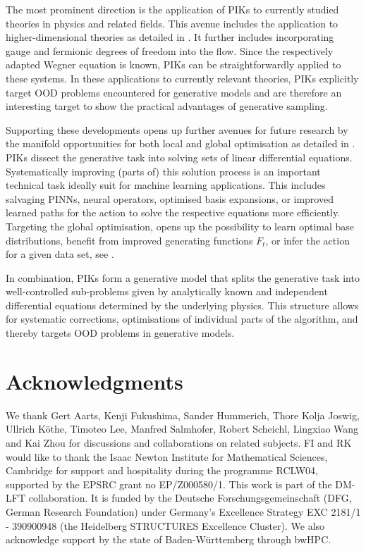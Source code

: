\documentclass[reprint,amsmath,amssymb,aps,pra,superscriptaddress,nofootinbib,twocolumn,floatfix,nolongbibliography]{revtex4-2}
\begin{document}
The most prominent direction is the application of PIKs to currently studied theories in physics and related fields. This avenue includes the application to higher-dimensional theories as detailed in . It further includes incorporating gauge and fermionic degrees of freedom into the flow. Since the respectively adapted Wegner equation is known, PIKs can be straightforwardly applied to these systems. In these applications to currently relevant theories, PIKs explicitly target OOD problems encountered for generative models and are therefore an interesting target to show the practical advantages of generative sampling.

Supporting these developments opens up further avenues for future research by the manifold opportunities for both local and global optimisation as detailed in . PIKs dissect the generative task into solving sets of linear differential equations. Systematically improving (parts of) this solution process is an important technical task ideally suit for machine learning applications. This includes salvaging PINNs, neural operators, optimised basis expansions, or improved learned paths for the action to solve the respective equations more efficiently. Targeting the global optimisation, opens up the possibility to learn optimal base distributions, benefit from improved generating functions $F_t$, or infer the action for a given data set, see .

In combination, PIKs form a generative model that splits the generative task into well-controlled sub-problems given by analytically known and independent differential equations determined by the underlying physics. This structure allows for systematic corrections, optimisations of individual parts of the algorithm, and thereby targets OOD problems in generative models.


\section*{Acknowledgments}

We thank Gert Aarts, Kenji Fukushima, Sander Hummerich, Thore Kolja Joswig, Ullrich Köthe, Timoteo Lee, Manfred Salmhofer, Robert Scheichl, Lingxiao Wang and Kai Zhou for discussions and collaborations on related subjects. FI and RK would like to thank the Isaac Newton Institute for Mathematical Sciences, Cambridge for support and hospitality during the programme RCLW04, supported by the EPSRC grant no EP/Z000580/1. This work is part of the DM-LFT collaboration. It is funded by the Deutsche Forschungsgemeinschaft (DFG, German Research Foundation) under Germany’s Excellence Strategy EXC 2181/1 - 390900948 (the Heidelberg STRUCTURES Excellence Cluster). We also acknowledge support by the
state of Baden-Württemberg through bwHPC.
\end{document}
